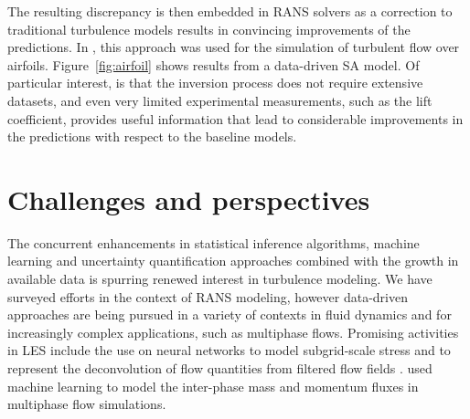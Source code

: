 \documentclass[a4paper]{ar-1col}
\begin{document}
 \begin{figure*}[!h]
\flushleft
 \begin{floatrow}
\hspace{-2 cm}
 \hspace{-3cm}
 \end{floatrow}
\caption{Example of application of inference and learning to turbulent flows over airfoils~\citep{singh2017machine-learning-augmented}.  (a) Pressure over airfoil surface (Green: Baseline model; Red: ML-augmented  model; Blue: Experimental measurements).(b) Baseline flow prediction (pressure contours and streamlines). (c) Flow prediction using data-driven SA model.}
\label{fig:airfoil}
\end{figure*}

The resulting discrepancy is then embedded in RANS solvers as a correction to traditional turbulence models results in convincing  improvements of the predictions. In \cite{singh2017machine-learning-augmented,singh2017augmentation}, this approach was used for  the simulation of turbulent flow over airfoils. Figure~\ref{fig:airfoil} shows results from a data-driven SA model.
Of particular interest, is that the inversion process does not require extensive datasets, and even very limited experimental measurements, such as the lift coefficient, 
provides useful information that lead to considerable improvements in the predictions with respect to the baseline models.  



\section{Challenges and perspectives}

The concurrent enhancements in statistical inference algorithms, machine learning and uncertainty quantification approaches combined with the growth in available data is spurring 
renewed interest in turbulence modeling. We have surveyed efforts in the context of RANS modeling, however data-driven approaches are being pursued in a variety of contexts in fluid dynamics   and for increasingly complex applications, such as multiphase flows. Promising activities in LES include the use on neural networks to model  subgrid-scale stress
 \citep{gamahara2017searching, vollant2014optimal, vollant2017subgrid-scale} and to represent the deconvolution of flow quantities from filtered flow fields  \citep{maulik2017neural}. 
 \citet{ma2015using,ma2016using} used machine learning to model the inter-phase mass and momentum fluxes in multiphase flow simulations.
\end{document}
